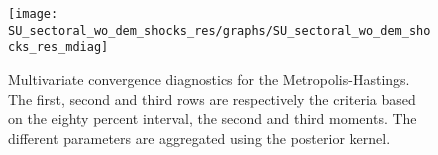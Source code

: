  
\begin{figure}[H]
\centering 
\texttt{[image: SU\_sectoral\_wo\_dem\_shocks\_res/graphs/SU\_sectoral\_wo\_dem\_shocks\_res\_mdiag]}
\caption{Multivariate convergence diagnostics for the Metropolis-Hastings.
The first, second and third rows are respectively the criteria based on
the eighty percent interval, the second and third moments. The different 
parameters are aggregated using the posterior kernel.}\label{Fig:MultivariateDiagnostics}
\end{figure}

